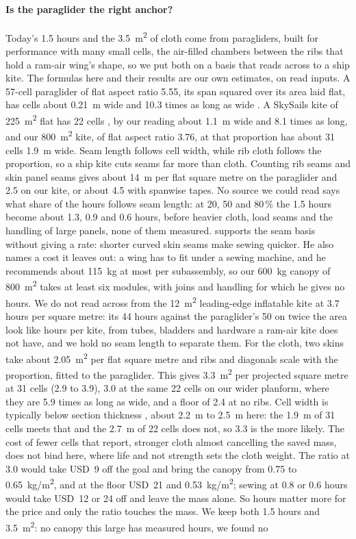 \paragraph{Is the paraglider the right anchor?} Today's 1.5 hours and the \SI{3.5}{m^2} of cloth come from paragliders, built for performance with many small cells, the air-filled chambers between the ribs that hold a ram-air wing's shape, so we put both on a basis that reads across to a ship kite. The formulas here and their results are our own estimates, on read inputs. A 57-cell paraglider of flat aspect ratio 5.55, its span squared over its area laid flat, has cells about \SI{0.21}{m} wide and 10.3 times as long as wide . A SkySails kite of \SI{225}{m^2} flat has 22 cells \citep{paulig2013}, by our reading about \SI{1.1}{m} wide and 8.1 times as long, and our \SI{800}{m^2} kite, of flat aspect ratio 3.76, at that proportion has about 31 cells \SI{1.9}{m} wide. Seam length follows cell width, while rib cloth follows the proportion, so a ship kite cuts seams far more than cloth. Counting rib seams and skin panel seams gives about \SI{14}{m} per flat square metre on the paraglider and 2.5 on our kite, or about 4.5 with spanwise tapes. No source we could read says what share of the hours follows seam length: at 20, 50 and 80\,\% the 1.5 hours become about 1.3, 0.9 and 0.6 hours, before heavier cloth, load seams and the handling of large panels, none of them measured. \citet{dunker2013} supports the seam basis without giving a rate: shorter curved skin seams make sewing quicker. He also names a cost it leaves out: a wing has to fit under a sewing machine, and he recommends about \SI{115}{kg} at most per subassembly, so our \SI{600}{kg} canopy of \SI{800}{m^2} takes at least six modules, with joins and handling for which he gives no hours. We do not read across from the \SI{12}{m^2} leading-edge inflatable kite at 3.7 hours per square metre: its 44 hours against the paraglider's 50 on twice the area look like hours per kite, from tubes, bladders and hardware a ram-air kite does not have, and we hold no seam length to separate them. For the cloth, two skins take about \SI{2.05}{m^2} per flat square metre and ribs and diagonals scale with the proportion, fitted to the paraglider. This gives \SI{3.3}{m^2} per projected square metre at 31 cells (2.9 to 3.9), 3.0 at the same 22 cells on our wider planform, where they are 5.9 times as long as wide, and a floor of 2.4 at no ribs. Cell width is typically below section thickness \citep{dunker2013}, about \SI{2.2}{m} to \SI{2.5}{m} here: the \SI{1.9}{m} of 31 cells meets that and the \SI{2.7}{m} of 22 cells does not, so 3.3 is the more likely. The cost of fewer cells that \citet{paulig2013} report, stronger cloth almost cancelling the saved mass, does not bind here, where life and not strength sets the cloth weight. The ratio at 3.0 would take USD~9 off the goal and bring the canopy from 0.75 to \SI{0.65}{kg/m^2}, and at the floor USD~21 and \SI{0.53}{kg/m^2}; sewing at 0.8 or 0.6 hours would take USD~12 or 24 off and leave the mass alone. So hours matter more for the price and only the ratio touches the mass. We keep both 1.5 hours and \SI{3.5}{m^2}: no canopy this large has measured hours, we found no 